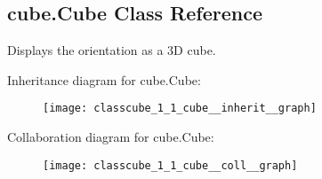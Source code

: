 \hypertarget{classcube_1_1_cube}{\subsection{cube.\-Cube Class Reference}
\label{classcube_1_1_cube}
}


Displays the orientation as a 3\-D cube.  




Inheritance diagram for cube.\-Cube\-:\nopagebreak
\begin{figure}[H]
\begin{center}
\leavevmode
\texttt{[image: classcube\_1\_1\_cube\_\_inherit\_\_graph]}
\end{center}
\end{figure}


Collaboration diagram for cube.\-Cube\-:\nopagebreak
\begin{figure}[H]
\begin{center}
\leavevmode
\texttt{[image: classcube\_1\_1\_cube\_\_coll\_\_graph]}
\end{center}
\end{figure}
